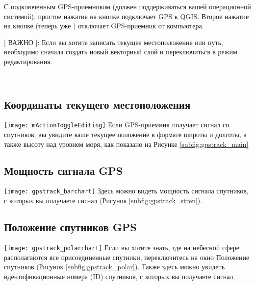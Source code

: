 С подключенным GPS-приемником (должен поддерживаться вашей операционной системой), простое нажатие на кнопке  подключает GPS к QGIS. Второе нажатие на кнопке (теперь уже ) отключает GPS-приемник от компьютера.

[ ВАЖНО ]: Если вы хотите записать текущее местоположение или путь, необходимо сначала создать новый векторный слой и переключиться в режим редактирования.

\begin{figure}[ht]
\centering
     \hspace{0.33cm}
     \hspace{0.33cm}
    \\
\end{figure}

\subsection{Координаты текущего местоположения}
\texttt{[image: mActionToggleEditing]} Если GPS-приемник получает сигнал со спутников, вы увидите ваше текущее положение в формате широты и долготы, а также высоту над уровнем моря, как показано на Рисунке \ref{subfig:gpstrack_main}

\subsection{Мощность сигнала GPS}
\texttt{[image: gpstrack\_barchart]} Здесь можно видеть мощность сигнала спутников, с которых вы получаете сигнал (Рисунок \ref{subfig:gpstrack_stren}).

\subsection{Положение спутников GPS}
\texttt{[image: gpstrack\_polarchart]} Если вы хотите знать, где на небесной сфере располагаются все присоединенные спутники, переключитесь на окно Положение спутников (Рисунок \ref{subfig:gpstrack_polar}). Также здесь можно увидеть идентификационные номера (ID) спутников, с которых вы получаете сигнал.

